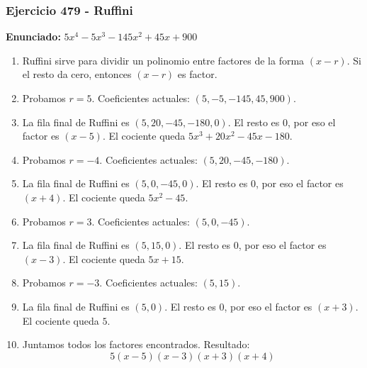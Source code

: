 \documentclass[11pt,a4paper]{article}
\begin{document}
\subsubsection*{Ejercicio 479 - Ruffini}
\textbf{Enunciado:} $ 5 x^{4} - 5 x^{3} - 145 x^{2} + 45 x + 900 $\par
\begin{enumerate}[leftmargin=2em]
\item Ruffini sirve para dividir un polinomio entre factores de la forma \((x-r)\). Si el resto da cero, entonces \((x-r)\) es factor.
\item Probamos \(r=5\). Coeficientes actuales: \((5, -5, -145, 45, 900)\).
\item La fila final de Ruffini es \((5, 20, -45, -180, 0)\). El resto es \(0\), por eso el factor es \((x-5)\). El cociente queda \(5 x^{3} + 20 x^{2} - 45 x - 180\).
\item Probamos \(r=-4\). Coeficientes actuales: \((5, 20, -45, -180)\).
\item La fila final de Ruffini es \((5, 0, -45, 0)\). El resto es \(0\), por eso el factor es \((x+4)\). El cociente queda \(5 x^{2} - 45\).
\item Probamos \(r=3\). Coeficientes actuales: \((5, 0, -45)\).
\item La fila final de Ruffini es \((5, 15, 0)\). El resto es \(0\), por eso el factor es \((x-3)\). El cociente queda \(5 x + 15\).
\item Probamos \(r=-3\). Coeficientes actuales: \((5, 15)\).
\item La fila final de Ruffini es \((5, 0)\). El resto es \(0\), por eso el factor es \((x+3)\). El cociente queda \(5\).
\item Juntamos todos los factores encontrados. Resultado: \[\boxed{5 \left(x - 5\right) \left(x - 3\right) \left(x + 3\right) \left(x + 4\right)}\]
\end{enumerate}

\vspace{0.2cm}
\end{document}
